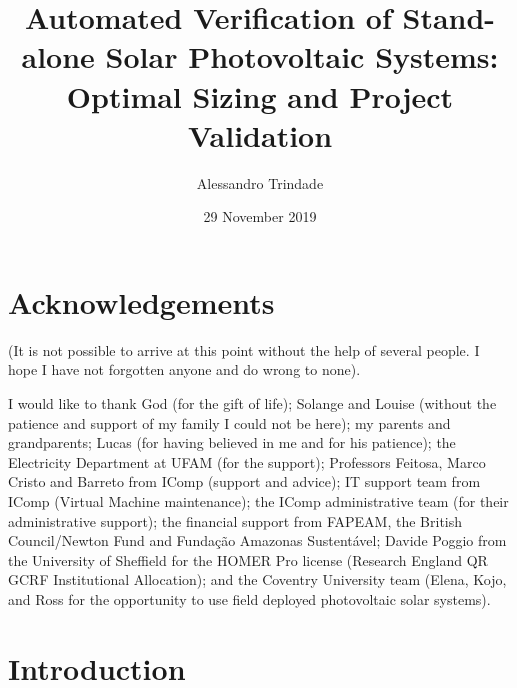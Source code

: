 \documentclass[12pt,twoside]{report}
\title{Automated Verification of Stand-alone Solar Photovoltaic Systems: Optimal Sizing and Project Validation}
\author{Alessandro Trindade}
\date{29 November 2019}
\renewcommand{\headrulewidth}{0.4pt}
\renewcommand{\footrulewidth}{0.4pt}
\begin{document}



\thispagestyle{empty}


\newpage 


\pagestyle{empty}
\newpage



%
%
\chapter*{Acknowledgements}
(It is not possible to arrive at this point without the help of several people. I hope I have not forgotten anyone and do wrong to none).

I would like to thank God (for the gift of life); Solange and Louise (without the patience and support of my family I could not be here); my parents and grandparents; Lucas (for having believed in me and for his patience); the Electricity Department at UFAM (for the support); Professors Feitosa, Marco Cristo and Barreto from IComp (support and advice); IT support team from IComp (Virtual Machine maintenance); the IComp administrative team (for their administrative support); the financial support from FAPEAM, the British Council/Newton Fund and Fundação Amazonas Sustentável; Davide Poggio from the University of Sheffield for the HOMER Pro license (Research England QR GCRF Institutional Allocation); and the Coventry University team (Elena, Kojo, and Ross for the opportunity to use field deployed photovoltaic solar systems).

\pagestyle{empty}

\tableofcontents

\listoffigures

\listoftables
\newpage 


\chapter{Introduction}
\pagestyle{fancy}
\fancyhead{}
\fancyfoot{}
\fancyfoot[LE,RO]{\thepage}
\renewcommand{\headrulewidth}{0.4pt}
\renewcommand{\footrulewidth}{0.4pt}

\end{document}
